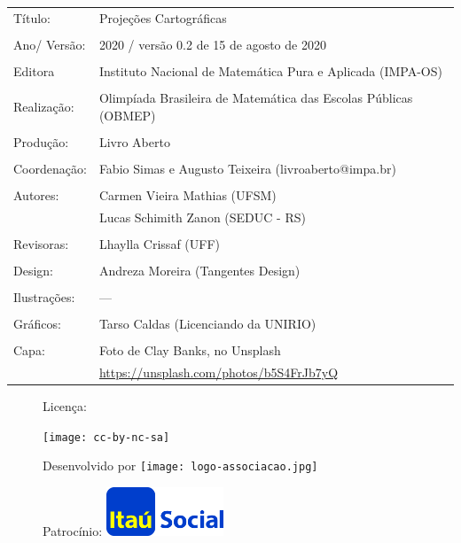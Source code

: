 \begin{tabular}{p{}p{}}
Título: & Projeções Cartográficas\\
\\
Ano/ Versão: & 2020 / versão 0.2 de 15 de agosto de 2020\\
\\
Editora & Instituto Nacional de Matem\'atica Pura e Aplicada (IMPA-OS)\\
\\
Realização:& Olimp\'iada Brasileira de Matem\'atica das Escolas P\'ublicas (OBMEP)\\
\\
Produção:& Livro Aberto\\
\\
Coordenação:& Fabio Simas e Augusto Teixeira (livroaberto@impa.br)\\
\\
  Autores: & Carmen Vieira Mathias (UFSM)\\
             & Lucas Schimith Zanon (SEDUC - RS)\\
\\
Revisoras: &  Lhaylla Crissaf (UFF) \\
\\
Design: & Andreza Moreira (Tangentes Design) \\
\\
  Ilustrações: & --- \\ 
\\
Gráficos: & Tarso Caldas (Licenciando da UNIRIO)\\
\\
  Capa: & Foto de Clay Banks, no Unsplash \\
  & \url{https://unsplash.com/photos/b5S4FrJb7yQ} \\
\end{tabular}
\vspace{.5cm}


\begin{figure}[b]
\begin{minipage}[l]{5cm}
\centering

{\large Licença:}

  \texttt{[image: cc-by-nc-sa]}
\end{minipage}\hfill
\begin{minipage}[c]{5cm}
\centering
{\large Desenvolvido por}
\texttt{[image: logo-associacao.jpg]}
\end{minipage}
\begin{minipage}[r]{5cm}
\centering

{\large Patrocínio:}
  \vspace{1em}
  \includegraphics[width=3.5cm]{itau}
\end{minipage}
\end{figure}


